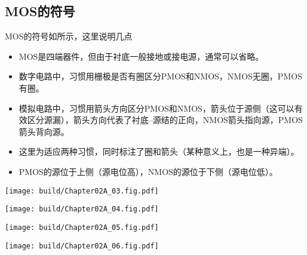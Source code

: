 \subsection{MOS的符号}
MOS的符号如所示，这里说明几点
\begin{itemize}
    \item MOS是四端器件，但由于衬底一般接地或接电源，通常可以省略。
    \item 数字电路中，习惯用栅极是否有圈区分PMOS和NMOS，NMOS无圈，PMOS有圈。
    \item 模拟电路中，习惯用箭头方向区分PMOS和NMOS，箭头位于源侧（这可以有效区分源漏），箭头方向代表了衬底--源结的正向，NMOS箭头指向源，PMOS箭头背向源。
    \item 这里为适应两种习惯，同时标注了圈和箭头（某种意义上，也是一种异端）。
    \item PMOS的源位于上侧（源电位高），NMOS的源位于下侧（源电位低）。
\end{itemize}
\begin{Figure}[MOS的符号]
    \begin{FigureSub}[三端NMOS]
        \texttt{[image: build/Chapter02A\_03.fig.pdf]}
    \end{FigureSub}
    \qquad
    \begin{FigureSub}[三端PMOS]
        \texttt{[image: build/Chapter02A\_04.fig.pdf]}
    \end{FigureSub}
    \qquad
    \begin{FigureSub}[四端NMOS]
        \texttt{[image: build/Chapter02A\_05.fig.pdf]}
    \end{FigureSub}
    \qquad
    \begin{FigureSub}[四端PMOS]
        \texttt{[image: build/Chapter02A\_06.fig.pdf]}
    \end{FigureSub}
\end{Figure}
